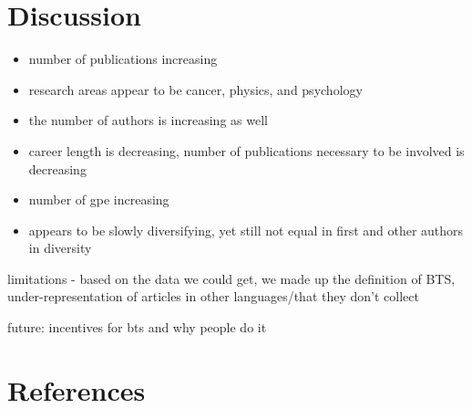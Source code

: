 \documentclass[
  man,floatsintext]{apa6}
\providecommand{\tightlist}{%
  \setlength{\itemsep}{0pt}\setlength{\parskip}{0pt}}
\begin{document}
\hypertarget{discussion}{%
\section{Discussion}\label{discussion}}

\begin{itemize}
\tightlist
\item
  number of publications increasing
\item
  research areas appear to be cancer, physics, and psychology
\item
  the number of authors is increasing as well
\item
  career length is decreasing, number of publications necessary to be involved is decreasing
\item
  number of gpe increasing
\item
  appears to be slowly diversifying, yet still not equal in first and other authors in diversity
\end{itemize}

limitations - based on the data we could get, we made up the definition of BTS, under-representation of articles in other languages/that they don't collect

future: incentives for bts and why people do it

\newpage

\hypertarget{references}{%
\section{References}\label{references}}

\begingroup
\setlength{\parindent}{-0.5in}
\setlength{\leftskip}{0.5in}
\end{document}
